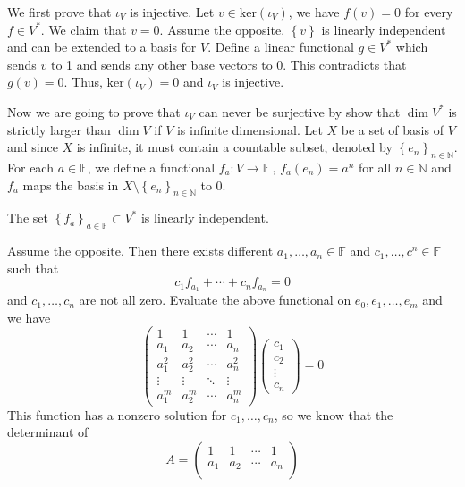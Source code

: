 \documentclass[a4paper, 12pt]{article}
\begin{document}
\begin{solution}
We first prove that \(\iota_V\) is injective. Let \(v \in \text{ker}(\iota_V)\), we have \(f(v)=0\) for every \(f\in V^*\). We claim that \(v=0\). Assume the opposite. \(\left\{v\right\}\) is linearly independent and can 
be extended to a basis for \(V\). Define a linear functional \(g\in V^*\) which sends \(v\) to 1 and sends any other base vectors to 0. This contradicts that \(g(v)=0\). Thus, \(\text{ker}(\iota_V)=0\) and \(\iota_V\) is injective.
\par 
Now we are going to prove that \(\iota_V\) can never be surjective by show that \(\dim V^*\) is strictly larger than \(\dim V\) if \(V\) is infinite dimensional. Let \(X\) be a set of basis of \(V\) and since \(X\) is infinite, it must contain a 
countable subset, denoted by \(\left\{ e_n \right\}_{n\in \mathbb{N}}\). For each \(a\in \mathbb{F}\), we define a functional \(f_a:V\rightarrow \mathbb{F}\, ,\, f_a(e_n)=a^n \) for all \(n\in \mathbb{N}\) and \(f_a\) maps the basis in \(X\setminus \left\{ e_n \right\}_{n\in \mathbb{N}}\) to \(0\). 
\begin{claim}
The set \(\left\{ f_a \right\}_{a\in \mathbb{F}}\subset V^*\) is linearly independent.
\end{claim}
\begin{claimproof}
Assume the opposite. Then there exists different \(a_1,\ldots,a_n\in \mathbb{F}\) and \(c_1,\ldots,c^n\in \mathbb{F}\) such that 
\[c_1f_{a_1}+\cdots+c_n f_{a_n}=0\]
and \(c_1,\ldots,c_n\) are not all zero. Evaluate the above functional on \(e_0,e_1,\ldots,e_m\) and we have 
\[\begin{pmatrix}
	1   & 1   & \cdots & 1\\ 
	a_1 & a_2 & \cdots & a_n\\ 
	a_1^2 & a_2^2 & \cdots & a_n^2\\ 
	\vdots & \vdots & \ddots & \vdots \\ 
	a_1^m & a_2^m & \cdots & a_n^m
\end{pmatrix}
\begin{pmatrix}
	c_1\\ 
	c_2\\ 
	\vdots\\ 
	c_n
\end{pmatrix}=0\]
This function has a nonzero solution for \(c_1,\ldots,c_n\), so we know that the determinant of 
\[A=\begin{pmatrix}
	1   & 1   & \cdots & 1\\ 
	a_1 & a_2 & \cdots & a_n\\ 

\end{pmatrix}\]
\end{claimproof}
\end{solution}
\end{document}
